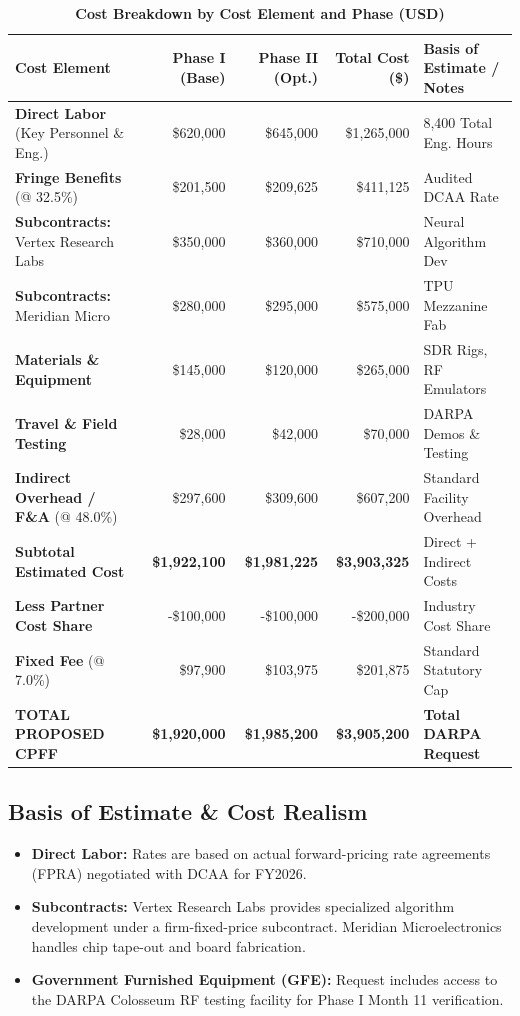 \documentclass[10pt,a4paper]{article}
\begin{document}
\begin{table}[h!]
\centering
\caption{\color{NavyPrimary}\bfseries Cost Breakdown by Cost Element and Phase (USD)}
\vspace{3pt}
\small
\begin{tabularx}{\linewidth}{@{}X r r r X@{}}
\toprule
\rowcolor{LightBg}
\textbf{Cost Element} & \textbf{Phase I (Base)} & \textbf{Phase II (Opt.)} & \textbf{Total Cost (\$)} & \textbf{Basis of Estimate / Notes} \\
\midrule
\textbf{Direct Labor} (Key Personnel \& Eng.) & \$620,000 & \$645,000 & \$1,265,000 & 8,400 Total Eng. Hours \\
\textbf{Fringe Benefits} (@ 32.5\%) & \$201,500 & \$209,625 & \$411,125 & Audited DCAA Rate \\
\textbf{Subcontracts:} Vertex Research Labs & \$350,000 & \$360,000 & \$710,000 & Neural Algorithm Dev \\
\textbf{Subcontracts:} Meridian Micro & \$280,000 & \$295,000 & \$575,000 & TPU Mezzanine Fab \\
\textbf{Materials \& Equipment} & \$145,000 & \$120,000 & \$265,000 & SDR Rigs, RF Emulators \\
\textbf{Travel \& Field Testing} & \$28,000 & \$42,000 & \$70,000 & DARPA Demos \& Testing \\
\textbf{Indirect Overhead / F\&A} (@ 48.0\%) & \$297,600 & \$309,600 & \$607,200 & Standard Facility Overhead \\
\midrule
\textbf{Subtotal Estimated Cost} & \textbf{\$1,922,100} & \textbf{\$1,981,225} & \textbf{\$3,903,325} & Direct + Indirect Costs \\
\textbf{Less Partner Cost Share} & -\$100,000 & -\$100,000 & -\$200,000 & Industry Cost Share \\
\textbf{Fixed Fee} (@ 7.0\%) & \$97,900 & \$103,975 & \$201,875 & Standard Statutory Cap \\
\midrule
\rowcolor{LightBg}
\textbf{TOTAL PROPOSED CPFF} & \textbf{\$1,920,000} & \textbf{\$1,985,200} & \textbf{\$3,905,200} & \textbf{Total DARPA Request} \\
\bottomrule
\end{tabularx}
\end{table}

\subsection{Basis of Estimate \& Cost Realism}
\begin{itemize}[leftmargin=15pt,itemsep=1.5pt]
  \item \textbf{Direct Labor:} Rates are based on actual forward-pricing rate agreements (FPRA) negotiated with DCAA for FY2026.
  \item \textbf{Subcontracts:} Vertex Research Labs provides specialized algorithm development under a firm-fixed-price subcontract. Meridian Microelectronics handles chip tape-out and board fabrication.
  \item \textbf{Government Furnished Equipment (GFE):} Request includes access to the DARPA Colosseum RF testing facility for Phase I Month 11 verification.
\end{itemize}
\end{document}
